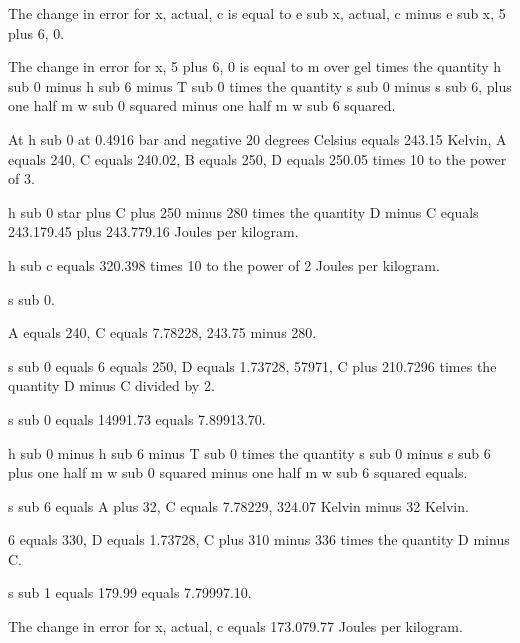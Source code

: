 The change in error for x, actual, c is equal to e sub x, actual, c minus e sub x, 5 plus 6, 0.

The change in error for x, 5 plus 6, 0 is equal to m over gel times the quantity h sub 0 minus h sub 6 minus T sub 0 times the quantity s sub 0 minus s sub 6, plus one half m w sub 0 squared minus one half m w sub 6 squared.

At h sub 0 at 0.4916 bar and negative 20 degrees Celsius equals 243.15 Kelvin, A equals 240, C equals 240.02, B equals 250, D equals 250.05 times 10 to the power of 3.

h sub 0 star plus C plus 250 minus 280 times the quantity D minus C equals 243.179.45 plus 243.779.16 Joules per kilogram.

h sub c equals 320.398 times 10 to the power of 2 Joules per kilogram.

s sub 0.

A equals 240, C equals 7.78228, 243.75 minus 280.

s sub 0 equals 6 equals 250, D equals 1.73728, 57971, C plus 210.7296 times the quantity D minus C divided by 2.

s sub 0 equals 14991.73 equals 7.89913.70.

h sub 0 minus h sub 6 minus T sub 0 times the quantity s sub 0 minus s sub 6 plus one half m w sub 0 squared minus one half m w sub 6 squared equals.

s sub 6 equals A plus 32, C equals 7.78229, 324.07 Kelvin minus 32 Kelvin.

6 equals 330, D equals 1.73728, C plus 310 minus 336 times the quantity D minus C.

s sub 1 equals 179.99 equals 7.79997.10.

The change in error for x, actual, c equals 173.079.77 Joules per kilogram.